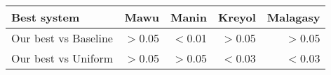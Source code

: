 \begin{tabular}{lrrrr}
\toprule
Best system & Mawu & Manin & Kreyol & Malagasy \\
\toprule
Our best vs Baseline & $>$0.05 & $<$0.01 & $>$0.05 & $>$0.05 \\
Our best vs Uniform & $>$0.05 & $>$0.05 & $<$0.03 & $<$0.03 \\
\bottomrule
\end{tabular}
